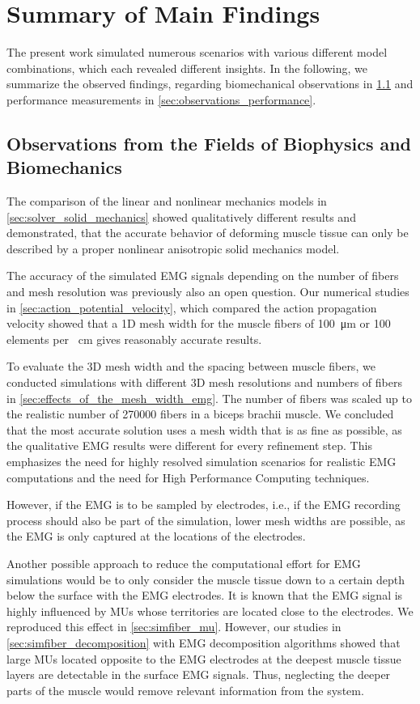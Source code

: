 \section{Summary of Main Findings}

The present work simulated numerous scenarios with various different model combinations, which each revealed different insights. In the following, we summarize the observed findings, regarding biomechanical observations in \cref{sec:observations_biophysics} and performance measurements in \cref{sec:observations_performance}.

\subsection{Observations from the Fields of Biophysics and Biomechanics}\label{sec:observations_biophysics}
The comparison of the linear and nonlinear mechanics models in \cref{sec:solver_solid_mechanics} showed qualitatively different results and demonstrated, that the accurate behavior of deforming muscle tissue can only be described by a proper nonlinear anisotropic solid mechanics model. 

The accuracy of the simulated EMG signals depending on the number of fibers and mesh resolution was previously also an open question. Our numerical studies in \cref{sec:action_potential_velocity}, which compared the action propagation velocity showed that a 1D mesh width for the muscle fibers of \SI{100}{\micro\meter} or 100 elements per \SI{}{\centi\meter} gives reasonably accurate results. 

To evaluate the 3D mesh width and the spacing between muscle fibers, we conducted simulations with different 3D mesh resolutions and numbers of fibers in \cref{sec:effects_of_the_mesh_width_emg}. The number of fibers was scaled up to the realistic number of \num{270000} fibers in a biceps brachii muscle. We concluded that the most accurate solution uses a mesh width that is as fine as possible, as the qualitative EMG results were different for every refinement step. This emphasizes the need for highly resolved simulation scenarios for realistic EMG computations and the need for High Performance Computing techniques.

However, if the EMG is to be sampled by electrodes, i.e., if the EMG recording process should also be part of the simulation, lower mesh widths are possible, as the EMG is only captured at the locations of the electrodes.

Another possible approach to reduce the computational effort for EMG simulations would be to only consider the muscle tissue down to a certain depth below the surface with the EMG electrodes. It is known that the EMG signal is highly influenced by MUs whose territories are located close to the electrodes. We reproduced this effect in \cref{sec:simfiber_mu}. However, our studies in \cref{sec:simfiber_decomposition} with EMG decomposition algorithms showed that large MUs located opposite to the EMG electrodes at the deepest muscle tissue layers are detectable in the surface EMG signals. Thus, neglecting the deeper parts of the muscle would remove relevant information from the system.


